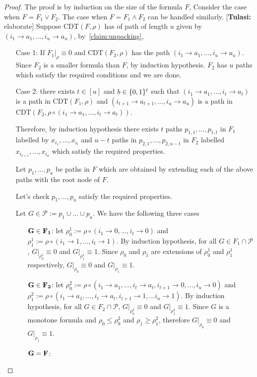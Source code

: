 \documentclass{article}
\newcommand{\cdt}{\mathrm{CDT}}
\newcommand{\calP}{\mathcal{P}}
\newcommand{\tulasi}[1]{{\color{teal} [{\bf Tulasi:} #1]}}
\begin{document}
\begin{proof}
    The proof is by induction on the size of the formula $F$, 
    Consider the case when $F = F_1 \vee F_2$. The case when $F = F_1 \wedge F_2$ can be handled similarly.\tulasi{elaborate}
    Suppose $\cdt(F,\rho)$ has of path of length $u$ given by $(i_1 \to a_1, \ldots ,i_u \to a_u)$, by~\cref{claim:unpacking}, 
    \begin{itemize}
        \item[Case 1:] If $F_1|_\rho \equiv 0$ and $\cdt(F_2,\rho)$ has the path $(i_1 \to a_1, \dots ,i_u \to a_u)$.\\
        Since $F_2$ is a smaller formula than $F$, by induction hypothesis. $F_2$ has $u$ paths which satisfy the required conditions and we are done. 
        \item[Case 2:] there exists $t \in [u]$ and $b \in \{0,1\}^{t}$ such that 
        $(i_1 \to a_1, \dots , i_t \to a_t)$ is a path in $\cdt(F_1,\rho)$ and $(i_{t+1} \to a_{t+1}, \dots ,i_u \to a_u)$ is a path in $\cdt(F_2, \rho \circ (i_1 \to a_1, \dots , i_t \to a_t))$.
        
        Therefore, by induction hypothesis there exists $t$ paths $p_{1,1}, \dots , p_{1,t}$ in $F_1$ labelled by $x_{i_1}, \dots , x_{i_t}$ and $u-t$ paths in $p_{2,1}, \dots , p_{2,u-t}$ in $F_2$ labelled $x_{i_{t+1}}, \dots , x_{i_u}$ which satisfy the required properties.
        
        Let $p_1, \dots , p_u$ be paths in $F$ which are obtained by extending each of the above paths with the root node of $F$.
        
        Let's check $p_1, \dots , p_u$ satisfy the required properties.
        
        Let $G \in \calP := p_1 \cup \dots \cup p_u$. We have the following three cases
        
        \begin{itemize}
            \item [$\bf{G \in F_1}$:] let $\rho^1_0 := \rho \circ (i_1 \to 0, \dots , i_t \to 0)$ and $\rho^1_1 := \rho \circ (i_1 \to 1, \dots , i_t \to 1)$. 
            By induction hypothesis, 
            for all $G \in F_1 \cap \calP$, $G|_{\rho^1_0} \equiv 0$ and 
            $G|_{\rho^1_1} \equiv 1$.
            Since $\rho_0$ and $\rho_1$ are extensions of $\rho^1_0$ and $\rho^1_1$ respectively, 
            $G|_{\rho_0} \equiv 0$ and $G|_{\rho_1} \equiv 1$.
            \item [$\bf{G \in F_2}$:]
                let $\rho^2_0 := \rho \circ (i_1 \to a_1, \dots , i_t \to a_t, i_{t+1} \to 0, \dots ,i_u \to 0)$ and $\rho^2_1 := \rho \circ (i_1 \to a_1, \dots , i_t \to a_t, i_{t+1 }\to 1, \dots i_u \to 1)$. 
                By induction hypothesis, 
            for all $G \in F_2 \cap \calP$, $G|_{\rho^2_0} \equiv 0$ and $G|_{\rho^2_1} \equiv 1$.
            Since $G$ is a monotone formula and $\rho_0 \leq \rho^2_0$ and $\rho_1 \geq \rho^2_1$, therefore
            $G|_{\rho_0} \equiv 0$ and $G|_{\rho_1} \equiv 1$.
            \item [$\bf{G = F}$:]
                

\end{itemize}
\end{itemize}
\end{proof}
\end{document}
